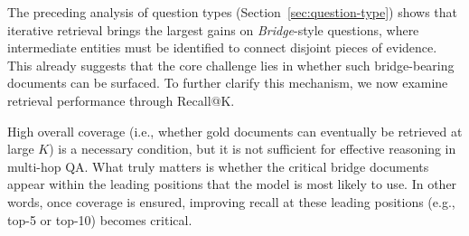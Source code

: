 \documentclass{article} %
\begin{document}




The preceding analysis of question types (Section~\ref{sec:question-type}) shows that iterative retrieval brings the largest gains on \emph{Bridge}-style questions, where intermediate entities must be identified to connect disjoint pieces of evidence. 
This already suggests that the core challenge lies in whether such bridge-bearing documents can be surfaced. 
To further clarify this mechanism, we now examine retrieval performance through Recall@K. 

High overall coverage (i.e., whether gold documents can eventually be retrieved at large $K$) is a necessary condition, 
but it is not sufficient for effective reasoning in multi-hop QA. 
What truly matters is whether the critical bridge documents appear within the leading positions that the model is most likely to use. 
In other words, once coverage is ensured, improving recall at these leading positions (e.g., top-5 or top-10) becomes critical.
\end{document}

